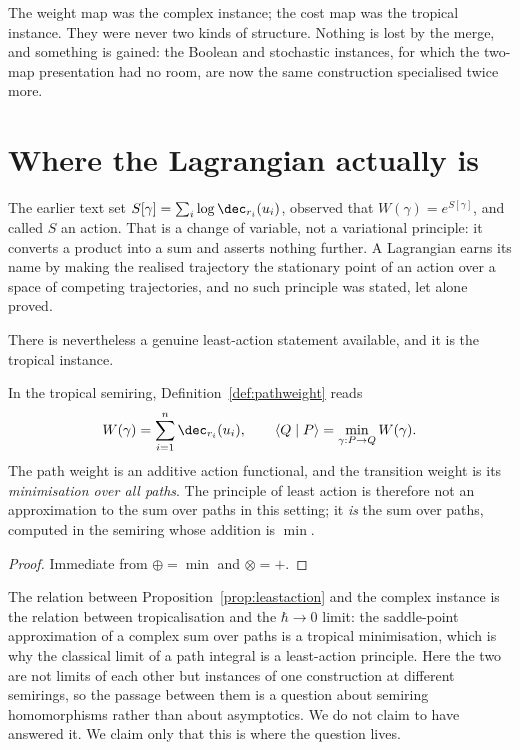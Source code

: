 \begin{remark}
The weight map was the complex instance; the cost map was the tropical
instance.  They were never two kinds of structure.  Nothing is lost by
the merge, and something is gained: the Boolean and stochastic instances,
for which the two-map presentation had no room, are now the same
construction specialised twice more.
\end{remark}

\section{Where the Lagrangian actually is}

The earlier text set $S[\gamma] = \sum_i \log \dec_{r_i}(u_i)$, observed
that $W(\gamma) = e^{S[\gamma]}$, and called $S$ an action.  That is a
change of variable, not a variational principle: it converts a product
into a sum and asserts nothing further.  A Lagrangian earns its name by
making the realised trajectory the stationary point of an action over a
space of competing trajectories, and no such principle was stated, let
alone proved.

There is nevertheless a genuine least-action statement available, and it
is the tropical instance.

\begin{proposition}
\label{prop:leastaction}
In the tropical semiring, Definition~\ref{def:pathweight} reads
\[
  W(\gamma) = \sum_{i=1}^{n} \dec_{r_i}(u_i),
  \qquad
  \langle Q \mid P \rangle = \min_{\gamma : P \to Q} W(\gamma).
\]
The path weight is an additive action functional, and the transition
weight is its \emph{minimisation over all paths}.  The principle of least
action is therefore not an approximation to the sum over paths in this
setting; it \emph{is} the sum over paths, computed in the semiring whose
addition is $\min$.
\end{proposition}

\begin{proof}
Immediate from $\oplus = \min$ and $\otimes = +$.
\end{proof}

\begin{remark}
The relation between Proposition~\ref{prop:leastaction} and the complex
instance is the relation between tropicalisation and the $\hbar \to 0$
limit: the saddle-point approximation of a complex sum over paths is a
tropical minimisation, which is why the classical limit of a path
integral is a least-action principle.  Here the two are not limits of
each other but instances of one construction at different semirings, so
the passage between them is a question about semiring homomorphisms
rather than about asymptotics.  We do not claim to have answered it.  We
claim only that this is where the question lives.
\end{remark}

